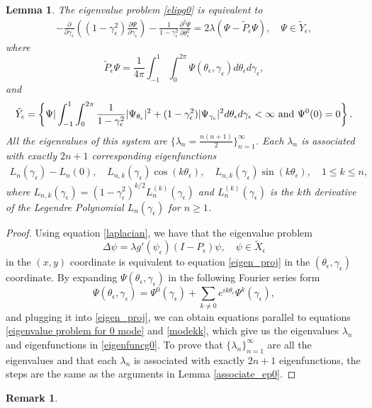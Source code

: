 \documentclass[1 [leqno, 11pt]{amsart}
\numberwithin{equation}{section}
\let\ep=\epsilon
\newtheorem{lemma}[Theorem]{Lemma}
\newtheorem{remark}[Theorem]{Remark}
\begin{document}
\begin{CJK*}{GBK}{song}
\begin{lemma}\label{eigen-ep}
The eigenvalue problem \eqref{elipg0}
is equivalent to
\begin{align}\label{eigen_proj}
 - \frac{\partial}{\partial \gamma_\ep} \left( (1-\gamma_\ep^2) \frac{\partial \Psi}{ \partial \gamma_\ep}  \right) -\frac{1}{1-\gamma_\ep^2}\frac{\partial ^2 \Psi}{\partial \theta_\ep ^2}= 2 \lambda (\Psi - \tilde{P}_\ep \Psi), \quad  \Psi \in \tilde{Y}_\ep,
\end{align}
where
$$\tilde{P}_\ep \Psi = \frac{1}{4\pi}\int_{-1}^1 \int_{0}^{2\pi} \Psi(\theta_\ep, \gamma_\ep) d \theta_\ep d \gamma_\ep,$$
and $$\tilde{Y}_\ep = \left\{ \Psi | \int_{-1}^1\int_{0}^{2\pi}{1\over1-\gamma_\ep^2}|\Psi_{\theta_\ep}|^2+(1-\gamma_\ep^2)|\Psi_{\gamma_\ep}|^2d \theta_\ep d\gamma_\ep< \infty \text{ and } \Psi^0( 0)= 0 \right\}.$$
All the eigenvalues of this system are $\{\lambda_n = \frac{n(n+1)}{2}\}_{n=1}^\infty$. Each $\lambda_n$ is associated with exactly $2n + 1$ corresponding eigenfunctions
\begin{align}\label{eigenfuncg0}
L_{n}(\gamma_\ep)- L_{n}(0), \quad L_{n,k}(\gamma_\ep) \cos(k\theta_\ep), \quad L_{n,k}(\gamma_\ep)\sin(k\theta_\ep), \quad  1 \leq k\leq n,
\end{align}
where $L_{n,k}(\gamma_\ep) = (1-\gamma_\ep^2)^{k/2}L^{(k)}_n(\gamma_\ep)$ and $L^{(k)}_n(\gamma_\ep)$ is the $k$th derivative of the Legendre Polynomial $L_{n}(\gamma_\ep)$ for $n \geq 1 $.
\end{lemma}
\begin{proof}
Using equation \eqref{laplacian}, we have that the eigenvalue problem
$$\Delta \psi = \lambda g'(\psi_\ep)(I-P_\ep)\psi, \quad \psi \in \tilde{X}_\ep$$ in the $(x,y)$ coordinate is equivalent to equation \eqref{eigen_proj} in the $(\theta_\ep, \gamma_\ep)$ coordinate.
By expanding $\Psi(\theta_\ep, \gamma_\ep)$ in the following Fourier series form
$$\Psi(\theta_\ep, \gamma_\ep) = \Psi^0(\gamma_\ep) + \sum_{k\neq 0}e^{ik\theta_\ep} \Psi^k(\gamma_\ep),$$
and plugging it into \eqref{eigen_proj}, we can obtain equations parallel to equations \eqref{eigenvalue problem for 0 mode} and \eqref{modekk}, which give us the eigenvalues $\lambda_n$ and eigenfunctions in \eqref{eigenfuncg0}.
To prove that $\{\lambda_n\}_{n=1}^\infty$ are all the eigenvalues and that each $\lambda_n$ is associated with exactly $2n+1$ eigenfunctions, the steps are the same as the arguments in Lemma \ref{associate_ep0}.
\end{proof}
\fi
\begin{remark}\label{X-ep-X0-A-ep-neg}

\end{remark}
\end{CJK*}
\end{document}
